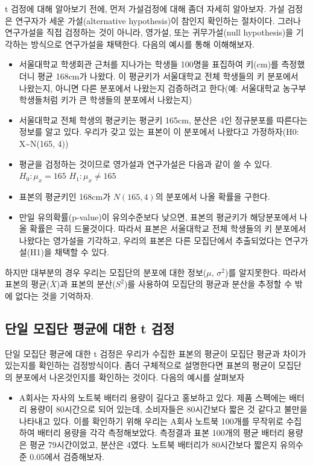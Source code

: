\documentclass[
]{book}
\providecommand{\tightlist}{%
  \setlength{\itemsep}{0pt}\setlength{\parskip}{0pt}}
\begin{document}
t 검정에 대해 알아보기 전에, 먼저 가설검정에 대해 좀더 자세히 알아보자. 가설 검정은 연구자가 세운 가설(alternative hypothesis)이 참인지 확인하는 절차이다. 그러나 연구가설을 직접 검정하는 것이 아니라, 영가설, 또는 귀무가설(null hypothesis)을 기각하는 방식으로 연구가설을 채택한다. 다음의 예시를 통해 이해해보자.

\begin{itemize}
\item
  서울대학교 학생회관 근처를 지나가는 학생들 100명을 표집하여 키(cm)를 측정했더니 평균 168cm가 나왔다. 이 평균키가 서울대학교 전체 학생들의 키 분포에서 나왔는지, 아니면 다른 분포에서 나왔는지 검증하려고 한다(예: 서울대학교 농구부 학생들처럼 키가 큰 학생들의 분포에서 나왔는지)
\item
  서울대학교 전체 학생의 평균키는 평균키 165cm, 분산은 4인 정규분포를 따른다는 정보를 알고 있다. 우리가 갖고 있는 표본이 이 분포에서 나왔다고 가정하자(H0: X\textasciitilde N(165, 4))
\item
  평균을 검정하는 것이므로 영가설과 연구가설은 다음과 같이 쓸 수 있다.
  \(H_0: \mu_x=165\)
  \(H_1: \mu_x\neq 165\)
\item
  표본의 평균키인 168cm가 \(N(165,4)\)의 분포에서 나올 확률을 구한다.
\item
  만일 유의확률(p-value)이 유의수준보다 낮으면, 표본의 평균키가 해당분포에서 나올 확률은 극히 드물것이다. 따라서 표본은 서울대학교 전체 학생들의 키 분포에서 나왔다는 영가설을 기각하고, 우리의 표본은 다른 모집단에서 추출되었다는 연구가설(H1)을 채택할 수 있다.
\end{itemize}

하지만 대부분의 경우 우리는 모집단의 분포에 대한 정보(\(\mu\), \(\sigma^2\))를 알지못한다. 따라서 표본의 평균(\(\bar{X}\))과 표본의 분산(\(S^2\))를 사용하여 모집단의 평균과 분산을 추정할 수 밖에 없다는 것을 기억하자.

\subsection{단일 모집단 평균에 대한 t 검정}\label{uxb2e8uxc77c-uxbaa8uxc9d1uxb2e8-uxd3c9uxade0uxc5d0-uxb300uxd55c-t-uxac80uxc815}

단일 모집단 평균에 대한 t 검정은 우리가 수집한 표본의 평균이 모집단 평균과 차이가 있는지를 확인하는 검정방식이다. 좀더 구체적으로 설명한다면 표본의 평균이 모집단의 분포에서 나온것인지를 확인하는 것이다. 다음의 예시를 살펴보자

\begin{itemize}
\tightlist
\item
  A회사는 자사의 노트북 배터리 용량이 길다고 홍보하고 있다. 제품 스펙에는 배터리 용량이 80시간으로 되어 있는데, 소비자들은 80시간보다 짧은 것 같다고 불만을 나타내고 있다. 이를 확인하기 위해 우리는 A회사 노트북 100개를 무작위로 수집하여 배터리 용량을 각각 측정해보았다. 측정결과 표본 100개의 평균 배터리 용량은 평균 79시간이었고, 분산은 4였다. 노트북 배터리가 80시간보다 짧은지 유의수준 0.05에서 검증해보자.
\end{itemize}
\end{document}
